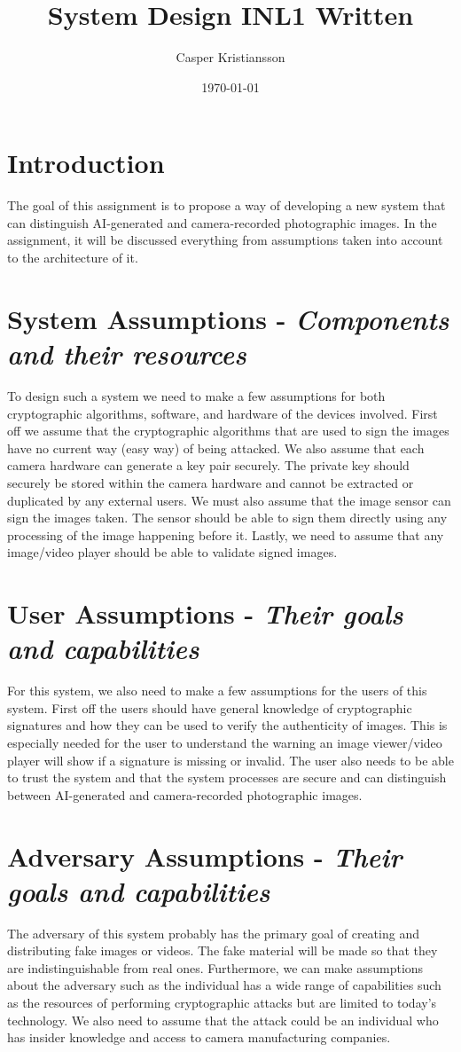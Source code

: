 \documentclass[9pt]{extarticle}
\title{System Design INL1 Written}
\author{Casper Kristiansson}
\date{\today}
\begin{document}
\maketitle

\section{Introduction}
The goal of this assignment is to propose a way of developing a new system that can distinguish AI-generated and camera-recorded photographic images. In the assignment, it will be discussed everything from assumptions taken into account to the architecture of it. 

\section{System Assumptions - \textit{Components and their resources}}
To design such a system we need to make a few assumptions for both cryptographic algorithms, software, and hardware of the devices involved. First off we assume that the cryptographic algorithms that are used to sign the images have no current way (easy way) of being attacked. We also assume that each camera hardware can generate a key pair securely. The private key should securely be stored within the camera hardware and cannot be extracted or duplicated by any external users. We must also assume that the image sensor can sign the images taken. The sensor should be able to sign them directly using any processing of the image happening before it. Lastly, we need to assume that any image/video player should be able to validate signed images.

\section{User Assumptions - \textit{Their goals and capabilities}}
For this system, we also need to make a few assumptions for the users of this system. First off the users should have general knowledge of cryptographic signatures and how they can be used to verify the authenticity of images. This is especially needed for the user to understand the warning an image viewer/video player will show if a signature is missing or invalid. The user also needs to be able to trust the system and that the system processes are secure and can distinguish between AI-generated and camera-recorded photographic images.

\section{Adversary Assumptions - \textit{Their goals and capabilities}}
The adversary of this system probably has the primary goal of creating and distributing fake images or videos. The fake material will be made so that they are indistinguishable from real ones. Furthermore, we can make assumptions about the adversary such as the individual has a wide range of capabilities such as the resources of performing cryptographic attacks but are limited to today's technology. We also need to assume that the attack could be an individual who has insider knowledge and access to camera manufacturing companies.
\end{document}

